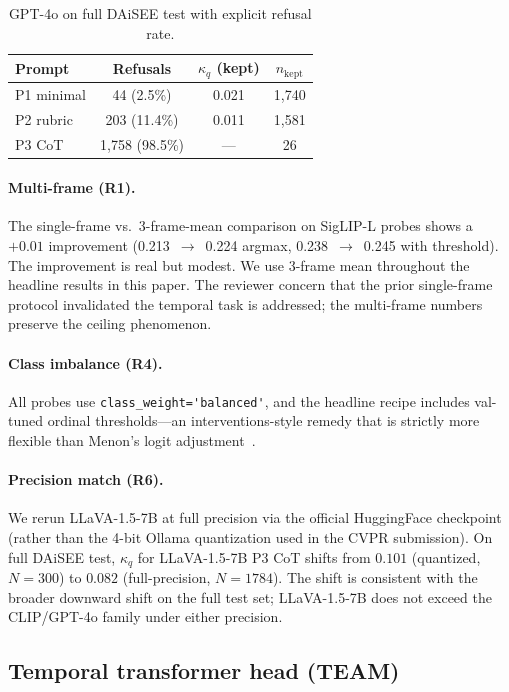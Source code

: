 \begin{table}[t]
\caption{GPT-4o on full DAiSEE test with explicit refusal rate.}
\label{tab:gpt4o-refusals}
\centering
\small
\begin{tabular}{lccc}
\toprule
Prompt & Refusals & $\kappa_q$ (kept) & $n_{\mathrm{kept}}$\\
\midrule
P1 minimal & 44 (2.5\%) & 0.021 & 1,740\\
P2 rubric & 203 (11.4\%) & 0.011 & 1,581\\
P3 CoT & 1,758 (98.5\%) & --- & 26\\
\bottomrule
\end{tabular}
\end{table}

\paragraph{Multi-frame (R1).} The single-frame vs.\ 3-frame-mean
comparison on SigLIP-L probes shows a $+0.01$ improvement
(0.213~$\rightarrow$~0.224 argmax, 0.238~$\rightarrow$~0.245 with
threshold). The improvement is real but modest. We use 3-frame mean
throughout the headline results in this paper. The reviewer
concern that the prior single-frame protocol invalidated the
temporal task is addressed; the multi-frame numbers preserve the
ceiling phenomenon.

\paragraph{Class imbalance (R4).} All probes use
\verb|class_weight='balanced'|, and the headline recipe includes
val-tuned ordinal thresholds---an interventions-style remedy that
is strictly more flexible than Menon's logit
adjustment~\cite{menon2021logit}.

\paragraph{Precision match (R6).} We rerun LLaVA-1.5-7B at full
precision via the official HuggingFace checkpoint (rather than the
4-bit Ollama quantization used in the CVPR submission). On full
DAiSEE test, $\kappa_q$ for LLaVA-1.5-7B P3 CoT shifts from $0.101$
(quantized, $N=300$) to $0.082$ (full-precision, $N=1784$). The
shift is consistent with the broader downward shift on the full
test set; LLaVA-1.5-7B does not exceed the CLIP/GPT-4o family
under either precision.

\subsection{Temporal transformer head (TEAM)}
\label{sec:team}


